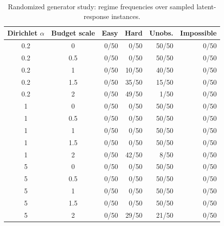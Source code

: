 \begin{table}[t]
\centering
\small
\caption{Randomized generator study: regime frequencies over sampled latent-response instances.}
\label{tab:random_generator_study}
\begin{tabular}{ccrrrr}
\toprule
Dirichlet $\alpha$ & Budget scale & Easy & Hard & Unobs. & Impossible \\
\midrule
0.2 & 0 & 0/50 & 0/50 & 50/50 & 0/50 \\
0.2 & 0.5 & 0/50 & 0/50 & 50/50 & 0/50 \\
0.2 & 1 & 0/50 & 10/50 & 40/50 & 0/50 \\
0.2 & 1.5 & 0/50 & 35/50 & 15/50 & 0/50 \\
0.2 & 2 & 0/50 & 49/50 & 1/50 & 0/50 \\
1 & 0 & 0/50 & 0/50 & 50/50 & 0/50 \\
1 & 0.5 & 0/50 & 0/50 & 50/50 & 0/50 \\
1 & 1 & 0/50 & 0/50 & 50/50 & 0/50 \\
1 & 1.5 & 0/50 & 0/50 & 50/50 & 0/50 \\
1 & 2 & 0/50 & 42/50 & 8/50 & 0/50 \\
5 & 0 & 0/50 & 0/50 & 50/50 & 0/50 \\
5 & 0.5 & 0/50 & 0/50 & 50/50 & 0/50 \\
5 & 1 & 0/50 & 0/50 & 50/50 & 0/50 \\
5 & 1.5 & 0/50 & 0/50 & 50/50 & 0/50 \\
5 & 2 & 0/50 & 29/50 & 21/50 & 0/50 \\
\bottomrule
\end{tabular}
\end{table}
